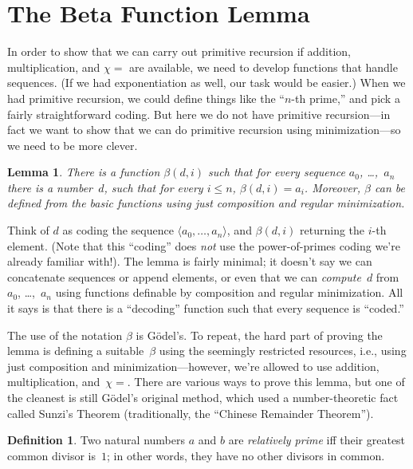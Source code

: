 \documentclass[10pt,a4paper]{article}
\theoremstyle{plain}
\newtheorem{lem}[thm]{Lemma}
\theoremstyle{definition}
\newtheorem{defn}[thm]{Definition}
\theoremstyle{remark}
\newcommand*{\olfileid}[3]{}
\newcommand*{\olsection}[1]{\section*{#1}}
\newcommand*{\ollabel}[1]{\label{#1}}
\providecommand{\tuple}[1]{\langle #1 \rangle}
\providecommand{\Char}{\chi}
\begin{document}



\olfileid{inc}{req}{bet}
\olsection{The Beta Function Lemma}


In order to show that we can carry out primitive recursion if
addition, multiplication, and $\Char{=}$ are available, we need to
develop functions that handle sequences. (If we had exponentiation as
well, our task would be easier.) When we had primitive recursion, we
could define things like the ``$n$-th prime,'' and pick a fairly
straightforward coding. But here we do not have primitive
recursion---in fact we want to show that we can do primitive recursion
using minimization---so we need to be more clever.

\begin{lem}
\ollabel{lem:beta}
There is a function $\beta(d,i)$ such that for every sequence $a_0$,
\dots,~$a_n$ there is a number~$d$, such that for every $i \le n$,
$\beta(d,i) = a_i$. Moreover, $\beta$ can be defined from the basic
functions using just composition and regular minimization.
\end{lem}

Think of $d$ as coding the sequence $\tuple{a_0, \dots, a_n}$, and
$\beta(d,i)$ returning the $i$-th element. (Note that this ``coding''
does \emph{not} use the power-of-primes coding we're already familiar
with!). The lemma is fairly minimal; it doesn't say we can concatenate
sequences or append elements, or even that we can \emph{compute}~$d$
from $a_0$, \dots,~$a_n$ using functions definable by composition and
regular minimization. All it says is that there is a ``decoding''
function such that every sequence is ``coded.''

The use of the notation $\beta$ is G\"odel's. To repeat, the hard part
of proving the lemma is defining a suitable~$\beta$ using the
seemingly restricted resources, i.e., using just composition and
minimization---however, we're allowed to use addition, multiplication,
and~$\Char{=}$. There are various ways to prove this lemma, but one of
the cleanest is still G\"odel's original method, which used a
number-theoretic fact called Sunzi's Theorem
(traditionally, the ``Chinese Remainder Theorem'').

\begin{defn}
Two natural numbers $a$ and $b$ are \emph{relatively prime} iff their
greatest common divisor is~$1$; in other words, they have no other
divisors in common.
\end{defn}
\end{document}
